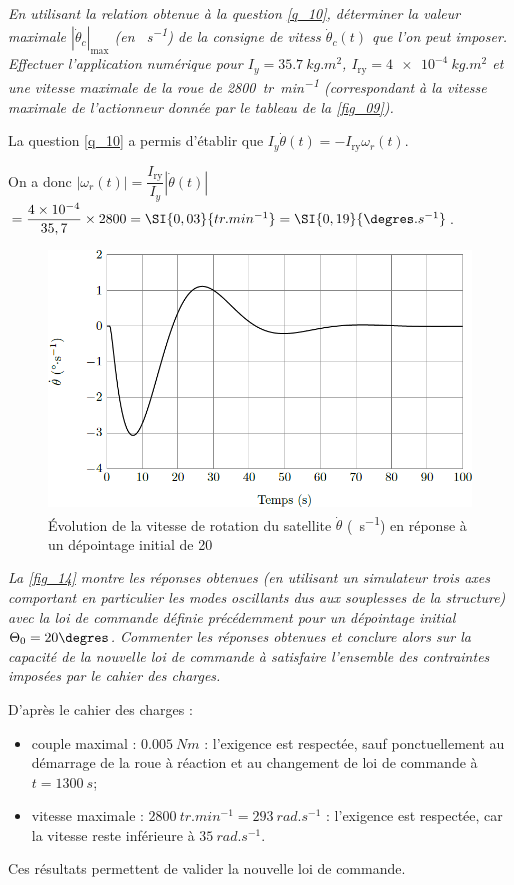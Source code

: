 \question{\label{q_29}}\textit{En utilisant la relation obtenue à la question \ref{q_10}, déterminer la valeur maximale
$|\dot{\theta}_c|_{\text{max}}$ (en \si{\degres.s^{-1}}) 
de la consigne de vitess $\dot{\theta}_c(t)$ que l’on peut imposer. Effectuer l’application numérique pour $I_y = \SI{35,7}{kg.m^2}$, $I_{\text{ry}}=\SI{4e-4}{kg.m^2}$ et une vitesse maximale de la roue de \SI{2800}{tr.min^{-1}} (correspondant à la vitesse maximale
de l’actionneur donnée par le tableau de la \autoref{fig_09}).}
\ifprof
\begin{corrige}
La question \ref{q_10} a permis d'établir que $I_y \dot{\theta}(t)=-I_{\text{ry}}\omega_r(t)$.

On a donc $\left| \omega_r(t) \right| = \dfrac{I_{\text{ry}}}{I_y}\left|\dot{\theta}(t)\right|$ 
$=\dfrac{4\times 10^{-4}}{35,7} \times 2800 =\SI{0,03}{tr.min^{-1}}=\SI{0,19}{\degres.s^{-1}} $.
\end{corrige}
\else
\fi

\ifprof
\else

\begin{figure}[H]
\centering
\includegraphics[width=.7\linewidth]{images/fig_13}
\caption{Évolution de la vitesse de rotation du satellite $\dot{\theta}$ (\si{\degres.s^{-1}}) en réponse à un dépointage initial de 20\degres \label{fig_13}}
\end{figure}
\fi


\question{\label{q_30}}\textit{La \autoref{fig_14} montre les réponses obtenues (en utilisant un simulateur trois axes comportant en particulier les modes oscillants dus aux souplesses de la structure) avec la loi de commande définie précédemment pour un dépointage initial $\Theta_0 = 20\degres$. Commenter les réponses obtenues et conclure alors sur la capacité de la nouvelle loi de commande à satisfaire l’ensemble des contraintes imposées par le cahier des charges.}
\ifprof
\begin{corrige}
D'après le cahier des charges : 
\begin{itemize}
\item couple maximal : $\SI{0,005}{Nm}$ : l'exigence est respectée, sauf ponctuellement au démarrage de la roue à réaction et au changement de loi de commande à $t=\SI{1300}{s}$;
\item vitesse maximale : $\SI{2800}{tr.min^{-1}} = \SI{293}{rad.s^{-1}}$ : l'exigence est respectée, car la vitesse reste inférieure à $\SI{35}{rad.s^{-1}}$.
\end{itemize}
Ces résultats permettent de valider la nouvelle loi de commande.
\end{corrige}
\else
\fi

